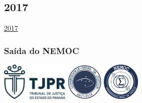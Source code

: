 \documentclass[10pt,
  aspectratio=169,
  serif,
  mathserif,
  professionalfont,
  compress,
  handout,
  ]{beamer}\usepackage[]{graphicx}\usepackage[]{color}
\begin{document}

\subsection{2017}

\begin{frame}[c, allowframebreaks]

\begin{center}

  {\huge \href{https://lineu96.github.io/st/}{2017}}
  
\end{center}

\end{frame}


\begin{frame}

\frametitle{Saída do NEMOC}

\begin{center}
  \includegraphics[height=1.8cm]{img/tjpr.png}\hspace{2em}
  \includegraphics[height=1.8cm]{img/corregedoria.png}\hspace{2em}
  \includegraphics[height=1.8cm]{img/nemoc.png}
\end{center}

\end{frame}

\end{document}
